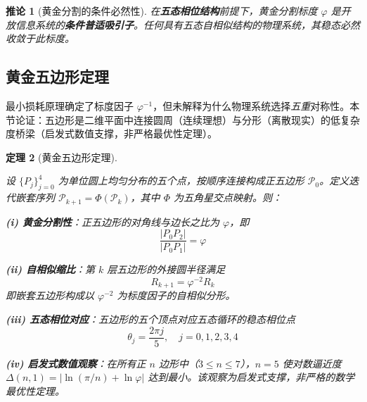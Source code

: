 \documentclass[12pt,a4paper,twocolumn]{article}
\renewcommand{\phi}{\varphi}
\newtheorem{theorem}{定理}[section]
\newtheorem{corollary}[theorem]{推论}
\begin{document}
\begin{corollary}[黄金分割的条件必然性]
在\textbf{五态相位结构}前提下，黄金分割标度 $\phi$ 是开放信息系统的\textbf{条件普适吸引子}。任何具有五态自相似结构的物理系统，其稳态必然收敛于此标度。
\end{corollary}

\subsection{黄金五边形定理}
\label{subsec:pentagon}

最小损耗原理确定了标度因子 $\phi^{-1}$，但未解释为什么物理系统选择\textit{五重}对称性。本节论证：五边形是二维平面中连接圆周（连续理想）与分形（离散现实）的低复杂度桥梁（启发式数值支撑，非严格最优性定理）。

\begin{theorem}[黄金五边形定理]
\label{thm:golden_pentagon}

设 $\{P_j\}_{j=0}^4$ 为单位圆上均匀分布的五个点，按顺序连接构成正五边形 $\mathcal{P}_0$。定义迭代嵌套序列 $\mathcal{P}_{k+1} = \Phi(\mathcal{P}_k)$，其中 $\Phi$ 为五角星交点映射。则：

\textbf{(i) 黄金分割性}：正五边形的对角线与边长之比为 $\phi$，即
\begin{equation}
\frac{|P_0P_2|}{|P_0P_1|} = \phi
\end{equation}

\textbf{(ii) 自相似缩比}：第 $k$ 层五边形的外接圆半径满足
\begin{equation}
R_{k+1} = \phi^{-2} R_k
\end{equation}
即嵌套五边形构成以 $\phi^{-2}$ 为标度因子的自相似分形。

\textbf{(iii) 五态相位对应}：五边形的五个顶点对应五态循环的稳态相位点
\begin{equation}
\theta_j = \frac{2\pi j}{5}, \quad j=0,1,2,3,4
\end{equation}

\textbf{(iv) 启发式数值观察}：在所有正 $n$ 边形中（$3 \le n \le 7$），$n=5$ 使对数逼近度 $\Delta(n,1) = |\ln(\pi/n) + \ln\phi|$ 达到最小。该观察为启发式支撑，非严格的数学最优性定理。
\end{theorem}
\end{document}
